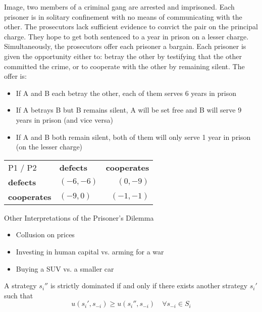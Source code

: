 \begin{example} \label{prisonersdilemma} 
	 Image, two members of a criminal gang are arrested and imprisoned. Each prisoner is in solitary confinement with no means of communicating with the other. The prosecutors lack sufficient evidence to convict the pair on the principal charge. They hope to get both sentenced to a year in prison on a lesser charge. Simultaneously, the prosecutors offer each prisoner a bargain. Each prisoner is given the opportunity either to: betray the other by testifying that the other committed the crime, or to cooperate with the other by remaining silent. The offer is:
	\begin{itemize}
		\item If A and B each betray the other, each of them serves 6 years in prison
		\item If A betrays B but B remains silent, A will be set free and B will serve 9 years in prison (and vice versa)
		\item If A and B both remain silent, both of them will only serve 1 year in prison (on the lesser charge)
	\end{itemize}
	
\begin{center}
	\begin{tabular}{|l|l|r|}
		\hline\hline
  			P1 / P2 & \textbf{defects} & \textbf{cooperates} \\
         		\cline{1-3}
   			\textbf{defects} & $(-6, -6)$ & $(0, -9)$ 	\arrayrulewidth2pt \\
            	\cline{1-3}
   			\textbf{cooperates} & $(-9, 0)$ & $(-1, -1)$ \\ \hline\hline
	\end{tabular}	
\end{center}


	Other Interpretations of the Prisoner's Dilemma
	\begin{itemize}
		\item Collusion on prices
		\item Investing in human capital vs. arming for a war
		\item Buying a SUV vs. a smaller car
	\end{itemize}
\end{example}

\begin{definition} 
	A strategy $s_{i}''$ is strictly dominated if and only if there exists another strategy $s_{i}'$ such that
	\[ u(s_{i}', s_{-i}) \geq u(s_{i}'', s_{-i}) \quad \forall s_{-i} \in S_{i} \]	
\end{definition}


